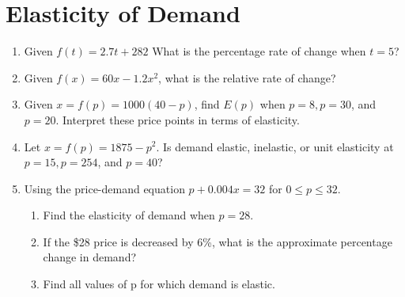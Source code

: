 \documentclass[14pt]{extarticle}
\begin{document}
\section{Elasticity of Demand}

	\begin{enumerate}
	\item Given $f(t) = 2.7t+282$ What is the percentage rate of change when $t=5$?
	\vspace{3cm}
	
	\item Given $f(x) = 60x- 1.2x^2$, what is the relative rate of change?
	\vspace{3cm}
			
	\item Given $x=f(p)=1000(40-p)$, find $E(p)$ when $p=8, p=30$, and $p=20$. Interpret these price points in terms of elasticity.
	\vspace{3cm}
	
	\item Let $x = f(p) =1875-p^2$. Is demand elastic, inelastic, or unit elasticity at $p=15, p=254$, and $p=40$?
	\vspace{3cm}
	
	\item Using the price-demand equation $p+0.004x = 32$ for $0 \leq p \leq 32$. 
	\begin{enumerate}
		\item Find the elasticity of demand when $p = 28$.
		\item If the \$28 price is decreased by 6\%, what is the approximate percentage change in demand?
		\item Find all values of p for which demand is elastic.
	\end{enumerate} 
	
\end{enumerate}


\cleardoublepage
\end{document}
